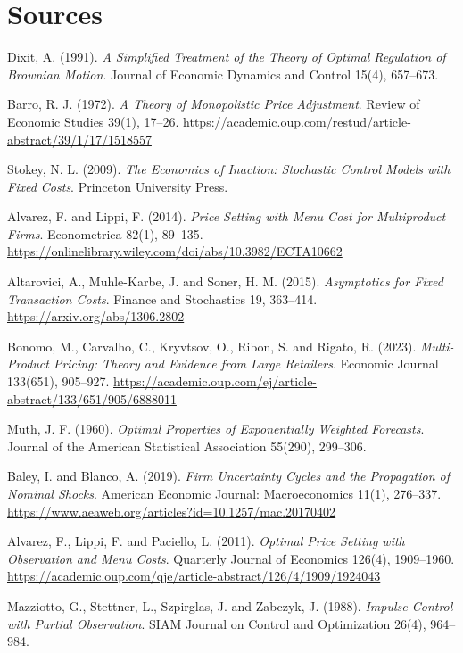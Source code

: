 \section*{Sources}
\begingroup\raggedright
\begin{enumerate}[label={[\arabic*]},leftmargin=2.5em]
\item Dixit, A. (1991). \emph{A Simplified Treatment of the Theory of Optimal Regulation of Brownian Motion}. Journal of Economic Dynamics and Control 15(4), 657--673.
\item Barro, R. J. (1972). \emph{A Theory of Monopolistic Price Adjustment}. Review of Economic Studies 39(1), 17--26. \url{https://academic.oup.com/restud/article-abstract/39/1/17/1518557}
\item Stokey, N. L. (2009). \emph{The Economics of Inaction: Stochastic Control Models with Fixed Costs}. Princeton University Press.
\item Alvarez, F. and Lippi, F. (2014). \emph{Price Setting with Menu Cost for Multiproduct Firms}. Econometrica 82(1), 89--135. \url{https://onlinelibrary.wiley.com/doi/abs/10.3982/ECTA10662}
\item Altarovici, A., Muhle-Karbe, J. and Soner, H. M. (2015). \emph{Asymptotics for Fixed Transaction Costs}. Finance and Stochastics 19, 363--414. \url{https://arxiv.org/abs/1306.2802}
\item Bonomo, M., Carvalho, C., Kryvtsov, O., Ribon, S. and Rigato, R. (2023). \emph{Multi-Product Pricing: Theory and Evidence from Large Retailers}. Economic Journal 133(651), 905--927. \url{https://academic.oup.com/ej/article-abstract/133/651/905/6888011}
\item Muth, J. F. (1960). \emph{Optimal Properties of Exponentially Weighted Forecasts}. Journal of the American Statistical Association 55(290), 299--306.
\item Baley, I. and Blanco, A. (2019). \emph{Firm Uncertainty Cycles and the Propagation of Nominal Shocks}. American Economic Journal: Macroeconomics 11(1), 276--337. \url{https://www.aeaweb.org/articles?id=10.1257/mac.20170402}
\item Alvarez, F., Lippi, F. and Paciello, L. (2011). \emph{Optimal Price Setting with Observation and Menu Costs}. Quarterly Journal of Economics 126(4), 1909--1960. \url{https://academic.oup.com/qje/article-abstract/126/4/1909/1924043}
\item Mazziotto, G., Stettner, L., Szpirglas, J. and Zabczyk, J. (1988). \emph{Impulse Control with Partial Observation}. SIAM Journal on Control and Optimization 26(4), 964--984.

\end{enumerate}
